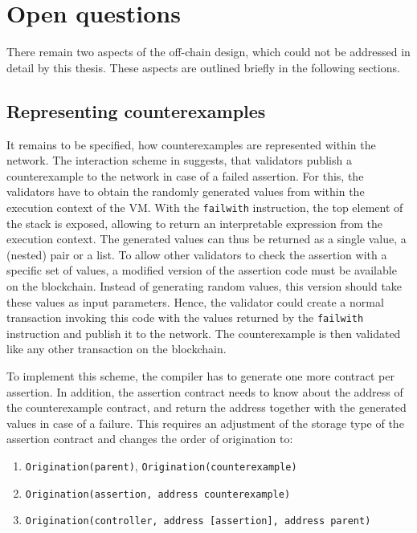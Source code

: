 \section{Open questions}
There remain two aspects of the off-chain design, which could not be addressed in detail by this thesis. These aspects are outlined briefly in the following sections.

\subsection{Representing counterexamples}\label{sec:counterexample}
It remains to be specified, how counterexamples are represented within the network. The interaction scheme in  suggests, that validators publish a counterexample to the network in case of a failed assertion. For this, the validators have to obtain the randomly generated values from within the execution context of the VM. With the \texttt{failwith} instruction, the top element of the stack is exposed, allowing to return an interpretable expression from the execution context. The generated values can thus be returned as a single value, a (nested) pair or a list. To allow other validators to check the assertion with a specific set of values, a modified version of the assertion code must be available on the blockchain. Instead of generating random values, this version should take these values as input parameters. Hence, the validator could create a normal transaction invoking this code with the values returned by the \texttt{failwith} instruction and publish it to the network. The counterexample is then validated like any other transaction on the blockchain. 

To implement this scheme, the compiler has to generate one more contract per assertion. In addition, the assertion contract needs to know about the address of the counterexample contract, and return the address together with the generated values in case of a failure. This requires an adjustment of the storage type of the assertion contract and changes the order of origination to:
\begin{enumerate}
\itemsep-0.5em
\item \texttt{Origination(parent)}, \texttt{Origination(counterexample)}
\item \texttt{Origination(assertion, address counterexample)}
\item \texttt{Origination(controller, address [assertion], address parent)} 
\end{enumerate}

